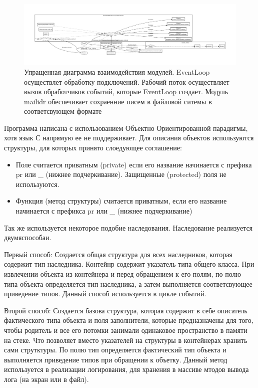 \documentclass[a4paper,12pt]{report}
\begin{document}
	\begin{figure}[H]
		\centering
		\includegraphics[width=\textwidth]{./resource/logic.pdf}
		\caption{Упращенная диаграмма взаимодействия модулей. EventLoop осуществлет обработку подключений. Рабочий поток осуществляет вызов обработчиков событий, которые EventLoop создает. Модуль mailidr обеспечивает сохраенние писем в файловой ситемы в соответсвующем формате} \label{fig:ProgLogic}
	\end{figure}

	Программа написана с использованием Объектно Ориентированной парадигмы, хотя язык С напрямую ее не поддерживает. Для описания объектов используются структуры, для которых принято слоедующее соглашение:
	\begin{itemize}
		\item Поле считается приватным (private) если его название начинается с префика pr или \_ (нижнее подчеркивание). Защищенные (protected) поля не используются.
		\item Функция (метод структуры) считается приватным, если его название начинается с префикса pr или \_ (нижнее подчеркивание)
	\end{itemize}
	Так же используется некоторое подобие наследования. Наследование реализуется двумяспособаи.

	 Первый способ: Создается общая структура для всех наследников, которая содержит тип наследника. Контейнр содержит указатель типа общего класса. При извлечении объекта из контейнера и перед обращением к его полям, по полю типа объекта определяется тип наследника, а затем выполняется соответсвующее приведение типов. Данный способ используется в цикле событий.

	 Второй способ: Создается базова структура, которая содержит в себе описатель фактического типа объекта и поля заполнители, которые предназначены для того, чтобы родитель и все его потомки занимали одинаковое пространство в памяти на стеке. Что позволяет вместо указателей на структуры в контейнерах хранить сами струтктуры. По полю тип определяется фактический тип объекта и выполняется приведение типов при обращении к объетку. Данный метод используется в реализации логирования, для хранения в массиве мтодов вывода лога (на экран или в файл).
\end{document}
